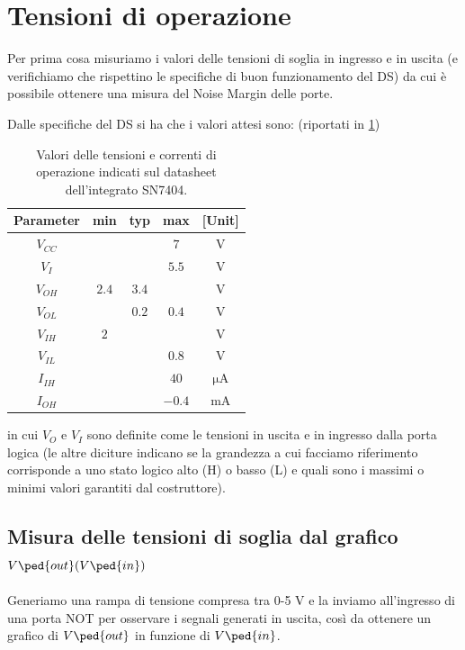 \documentclass[10pt, a4paper, italian]{article}
\begin{document}
\section{Tensioni di operazione}\label{sec: tens}
Per prima cosa misuriamo i valori delle tensioni di soglia in ingresso e in
uscita (e verifichiamo che rispettino le specifiche di buon funzionamento del
DS) da cui è possibile ottenere una misura del Noise Margin delle porte.

Dalle specifiche del DS si ha che i valori attesi sono: (riportati in
\cref{tab: notDS})
\begin{table}[htbp]
\centering
\begin{tabular}{cccc|c}
\toprule
Parameter  & min & typ & max & [Unit] \\
\midrule
\midrule
$V_{CC}$ &  &  & $7$ & V \\
$V_I$	 &  &  & $5.5$ & V\\
$V_{OH}$ & $2.4$  & $3.4$ & & V \\
$V_{OL}$ &   & $0.2$ & $0.4$ & V \\
$V_{IH}$ & $2$  &  & & V  \\
$V_{IL}$ &  &  & $0.8$ & V \\
$I_{IH}$ &  &  & $40$ & $\si{\micro\A}$ \\
$I_{OH}$ &  &  & $-0.4$ & mA \\
\bottomrule 
\end{tabular}
\caption{Valori delle tensioni e correnti di operazione indicati sul
datasheet dell'integrato SN7404.}
\label{tab: notDS}
\end{table}

in cui $V_O$ e $V_I$ sono definite come le tensioni in uscita e in ingresso
dalla porta logica (le altre diciture indicano se la grandezza a cui facciamo
riferimento corrisponde a uno stato logico alto (H) o basso (L) e quali sono
i massimi o minimi valori garantiti dal costruttore).

\subsection{Misura delle tensioni di soglia dal grafico
$V\ped{out}(V\ped{in})$}
Generiamo una rampa di tensione compresa tra 0-5 V e la inviamo
all'ingresso di una porta NOT per osservare i segnali generati in uscita,
così da ottenere un grafico di $V\ped{out}$ in funzione di $V\ped{in}$.
\end{document}
